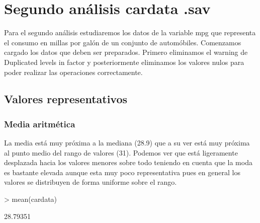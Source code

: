 \documentclass [a4paper] {article}
\begin{document}
\newpage
\section{Segundo análisis cardata .sav}

Para el segundo análisis estudiaremos los datos de la variable mpg que representa el consumo en millas por galón de un conjunto de automóbiles.
Comenzamos cargado los datos que deben ser preparados. 
Primero eliminamos el warning de Duplicated levels in factor y posteriormente eliminamos los valores nulos para poder realizar las operaciones correctamente.
\begin{Schunk}
\end{Schunk}

\subsection{Valores representativos}
\subsubsection{Media aritmética}
La media está muy próxima a la mediana (28.9) que a su ver está muy próxima al punto medio del rango de valores (31).
Podemos ver que está ligeramente desplazada hacia los valores menores sobre todo teniendo en cuenta que la moda es bastante elevada 
aunque esta muy poco representativa pues en general los valores se distribuyen de forma uniforme sobre el rango.
\begin{Schunk}
\begin{Sinput}
> mean(cardata)
\end{Sinput}
\begin{Soutput}
[1] 28.79351
\end{Soutput}
\end{Schunk}
\end{document}
